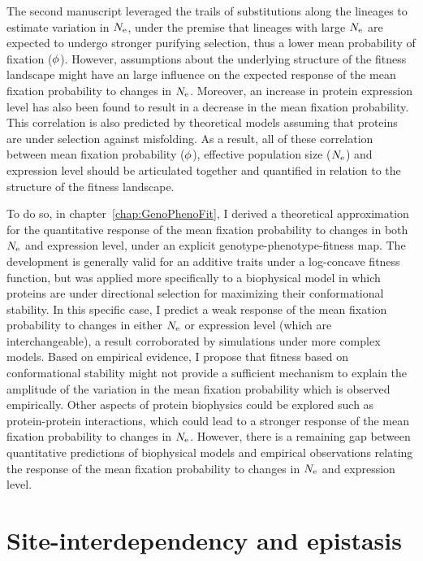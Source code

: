 The second manuscript leveraged the trails of substitutions along the lineages to estimate variation in $N_{\textrm{e}}$, under the premise that lineages with large $N_{\textrm{e}}$ are expected to undergo stronger purifying selection, thus a lower mean probability of fixation ($\phi$).
However, assumptions about the underlying structure of the fitness landscape might have an large influence on the expected response of the mean fixation probability to changes in $N_{\textrm{e}}$.
Moreover, an increase in protein expression level has also been found to result in a decrease in the mean fixation probability.
This correlation is also predicted by theoretical models assuming that proteins are under selection against misfolding.
As a result, all of these correlation between mean fixation probability ($\phi$), effective population size ($N_{\textrm{e}}$) and expression level should be articulated together and quantified in relation to the structure of the fitness landscape.

To do so, in chapter~\ref{chap:GenoPhenoFit}, I derived a theoretical approximation for the quantitative response of the mean fixation probability to changes in both $N_{\textrm{e}}$ and expression level, under an explicit genotype-phenotype-fitness map.
The development is generally valid for an additive traits under a log-concave fitness function, but was applied more specifically to a biophysical model in which proteins are under directional selection for maximizing their conformational stability.
In this specific case, I predict a weak response of the mean fixation probability to changes in either $N_{\textrm{e}}$ or expression level (which are interchangeable), a result corroborated by simulations under more complex models.
Based on empirical evidence, I propose that fitness based on conformational stability might not provide a sufficient mechanism to explain the amplitude of the variation in the mean fixation probability which is observed empirically.
Other aspects of protein biophysics could be explored such as protein-protein interactions, which could lead to a stronger response of the mean fixation probability to changes in $N_{\textrm{e}}$.
However, there is a remaining gap between quantitative predictions of biophysical models and empirical observations relating the response of the mean fixation probability to changes in $N_{\textrm{e}}$ and expression level.


\section{Site-interdependency and epistasis}
\label{sec:epistasis-and-entrenchment}

